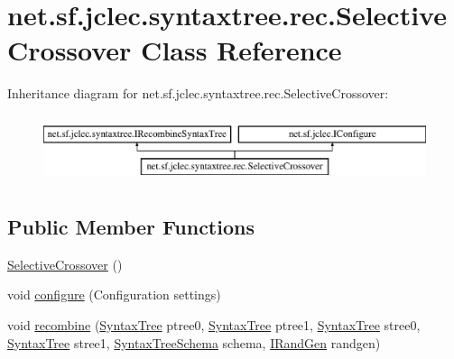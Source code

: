 \hypertarget{classnet_1_1sf_1_1jclec_1_1syntaxtree_1_1rec_1_1_selective_crossover}{\section{net.\-sf.\-jclec.\-syntaxtree.\-rec.\-Selective\-Crossover Class Reference}
\label{classnet_1_1sf_1_1jclec_1_1syntaxtree_1_1rec_1_1_selective_crossover}
}
Inheritance diagram for net.\-sf.\-jclec.\-syntaxtree.\-rec.\-Selective\-Crossover\-:\begin{figure}[H]
\begin{center}
\leavevmode
\includegraphics[height=1.985816cm]{classnet_1_1sf_1_1jclec_1_1syntaxtree_1_1rec_1_1_selective_crossover}
\end{center}
\end{figure}
\subsection*{Public Member Functions}
\begin{DoxyCompactItemize}
\item 
\hyperlink{classnet_1_1sf_1_1jclec_1_1syntaxtree_1_1rec_1_1_selective_crossover_af437026178db66092bd5cfc4400659da}{Selective\-Crossover} ()
\item 
void \hyperlink{classnet_1_1sf_1_1jclec_1_1syntaxtree_1_1rec_1_1_selective_crossover_a2a02b77eeaf2a526cf113d9716e0d8d7}{configure} (Configuration settings)
\item 
void \hyperlink{classnet_1_1sf_1_1jclec_1_1syntaxtree_1_1rec_1_1_selective_crossover_a429461ee2850c879657b0dab2e800bb9}{recombine} (\hyperlink{classnet_1_1sf_1_1jclec_1_1syntaxtree_1_1_syntax_tree}{Syntax\-Tree} ptree0, \hyperlink{classnet_1_1sf_1_1jclec_1_1syntaxtree_1_1_syntax_tree}{Syntax\-Tree} ptree1, \hyperlink{classnet_1_1sf_1_1jclec_1_1syntaxtree_1_1_syntax_tree}{Syntax\-Tree} stree0, \hyperlink{classnet_1_1sf_1_1jclec_1_1syntaxtree_1_1_syntax_tree}{Syntax\-Tree} stree1, \hyperlink{classnet_1_1sf_1_1jclec_1_1syntaxtree_1_1_syntax_tree_schema}{Syntax\-Tree\-Schema} schema, \hyperlink{interfacenet_1_1sf_1_1jclec_1_1util_1_1random_1_1_i_rand_gen}{I\-Rand\-Gen} randgen)
\end{DoxyCompactItemize}
